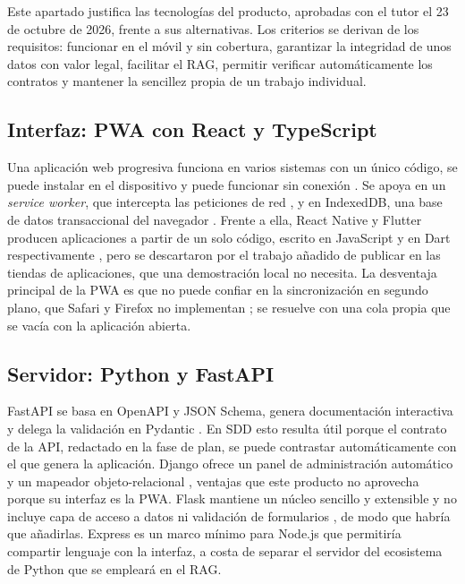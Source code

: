 Este apartado justifica las tecnologías del producto, aprobadas con el tutor el 23 de octubre de 2026, frente a sus alternativas. Los criterios se derivan de los requisitos: funcionar en el móvil y sin cobertura, garantizar la integridad de unos datos con valor legal, facilitar el RAG, permitir verificar automáticamente los contratos y mantener la sencillez propia de un trabajo individual.

\subsection{Interfaz: PWA con React y TypeScript}\label{subsec:TecFrontend}

Una aplicación web progresiva funciona en varios sistemas con un único código, se puede instalar en el dispositivo y puede funcionar sin conexión \citep{mdn-pwa}. Se apoya en un \emph{service worker}, que intercepta las peticiones de red \citep{mdn-service-worker}, y en IndexedDB, una base de datos transaccional del navegador \citep{mdn-indexeddb}. Frente a ella, React Native y Flutter producen aplicaciones a partir de un solo código, escrito en JavaScript y en Dart respectivamente \citep{reactnative,flutter}, pero se descartaron por el trabajo añadido de publicar en las tiendas de aplicaciones, que una demostración local no necesita. La desventaja principal de la PWA es que no puede confiar en la sincronización en segundo plano, que Safari y Firefox no implementan \citep{caniuse-background-sync}; se resuelve con una cola propia que se vacía con la aplicación abierta.

\subsection{Servidor: Python y FastAPI}\label{subsec:TecBackend}

FastAPI se basa en OpenAPI y JSON Schema, genera documentación interactiva y delega la validación en Pydantic \citep{fastapi-features}. En SDD esto resulta útil porque el contrato de la API, redactado en la fase de plan, se puede contrastar automáticamente con el que genera la aplicación. Django ofrece un panel de administración automático y un mapeador objeto-relacional \citep{django-overview}, ventajas que este producto no aprovecha porque su interfaz es la PWA. Flask mantiene un núcleo sencillo y extensible y no incluye capa de acceso a datos ni validación de formularios \citep{flask-design}, de modo que habría que añadirlas. Express es un marco mínimo para Node.js \citep{expressjs} que permitiría compartir lenguaje con la interfaz, a costa de separar el servidor del ecosistema de Python que se empleará en el RAG.

